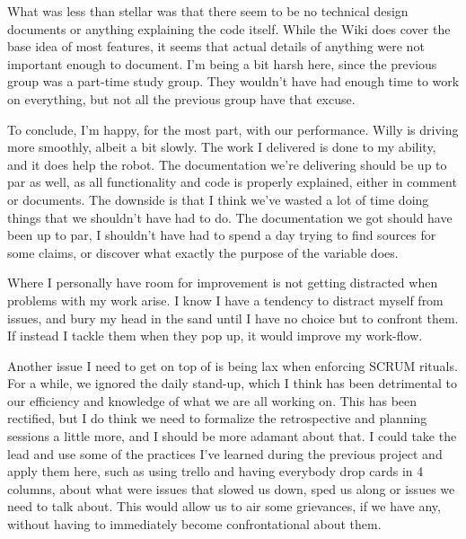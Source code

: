What was less than stellar was that there seem to be no technical design documents or anything explaining the code itself.
While the Wiki does cover the base idea of most features, it seems that actual details of anything were not important enough to document.
I'm being a bit harsh here, since the previous group was a part-time study group.
They wouldn't have had enough time to work on everything, but not all the previous group have that excuse.

To conclude, I'm happy, for the most part, with our performance.
Willy is driving more smoothly, albeit a bit slowly.
The work I delivered is done to my ability, and it does help the robot.
The documentation we're delivering should be up to par as well, as all functionality and code is properly explained, either in comment or documents.
The downside is that I think we've wasted a lot of time doing things that we shouldn't have had to do.
The documentation we got should have been up to par, I shouldn't have had to spend a day trying to find sources for some claims, or discover what exactly the purpose of the variable  does.

Where I personally have room for improvement is not getting distracted when problems with my work arise.
I know I have a tendency to distract myself from issues, and bury my head in the sand until I have no choice but to confront them.
If instead I tackle them when they pop up, it would improve my work-flow.

Another issue I need to get on top of is being lax when enforcing SCRUM rituals.
For a while, we ignored the daily stand-up, which I think has been detrimental to our efficiency and knowledge of what we are all working on.
This has been rectified, but I do think we need to formalize the retrospective and planning sessions a little more, and I should be more adamant about that.
I could take the lead and use some of the practices I've learned during the previous project and apply them here, such as using trello and having everybody drop cards in 4 columns, about what were issues that slowed us down, sped us along or issues we need to talk about.
This would allow us to air some grievances, if we have any, without having to immediately become confrontational about them.



\newpage